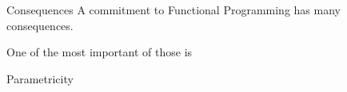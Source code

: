 \begin{frame}
\begin{block}{Consequences}
A commitment to Functional Programming has many consequences.
\end{block}
\end{frame}

\begin{frame}
\begin{center}
One of the most important of those is
\end{center}
\begin{center}
Parametricity
\end{center}
\end{frame}
